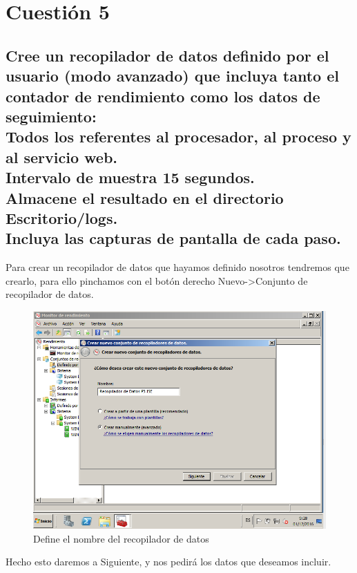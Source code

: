 \section{Cuestión 5}
\subsection{\Large Cree un recopilador de datos definido por el usuario (modo avanzado) que incluya tanto el contador de rendimiento como los datos de seguimiento:\\Todos los referentes al procesador, al proceso y al servicio web.\\Intervalo de muestra 15 segundos.\\Almacene el resultado en el directorio Escritorio/logs.\\Incluya las capturas de pantalla de cada paso.}

Para crear un recopilador de datos que hayamos definido nosotros tendremos que crearlo, para ello pinchamos con el botón derecho Nuevo->Conjunto de recopilador de datos.

\begin{figure}[H] %
	\centering
	\includegraphics[scale=0.5]{imagenes/CD-1.png}  %
	\caption{Define el nombre del recopilador de datos}
\end{figure}

Hecho esto daremos a Siguiente, y nos pedirá los datos que deseamos incluir.

